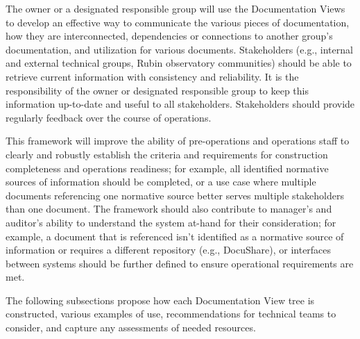 The owner or a designated responsible group will use the Documentation Views to develop an effective way to communicate the various pieces of documentation, how they are interconnected, dependencies or connections to another group's documentation, and utilization for various documents.
Stakeholders (e.g., internal and external technical groups, Rubin observatory communities) should be able to retrieve current information with consistency and reliability.
It is the responsibility of the owner or designated responsible group to keep this information up-to-date and useful to all stakeholders.
Stakeholders should provide regularly feedback over the course of operations.

This framework will improve the ability of pre-operations and operations staff to clearly and robustly establish the criteria and requirements for construction completeness and operations readiness; for example, all identified normative sources of information should be completed, or a use case where multiple documents referencing one normative source better serves multiple stakeholders than one document.
The framework should also contribute to manager's and auditor's ability to understand the system at-hand for their consideration; for example, a document that is referenced isn't identified as a normative source of information or requires a different repository (e.g., DocuShare), or interfaces between systems should be further defined to ensure operational requirements are met.

The following subsections propose how each Documentation View tree is constructed, various examples of use, recommendations for technical teams to consider, and capture any assessments of needed resources.

